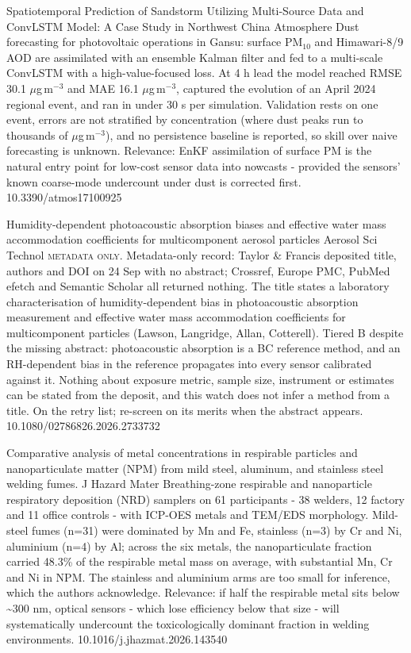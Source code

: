 \documentclass[10pt]{article}
\begin{document}
{Spatiotemporal Prediction of Sandstorm Utilizing Multi-Source Data and ConvLSTM Model: A Case Study in Northwest China}
{Atmosphere}
{Dust forecasting for photovoltaic operations in Gansu: surface PM$_{10}$ and Himawari-8/9 AOD are assimilated with an ensemble Kalman filter and fed to a multi-scale ConvLSTM with a high-value-focused loss. At 4 h lead the model reached RMSE 30.1 $\mu$g\,m$^{-3}$ and MAE 16.1 $\mu$g\,m$^{-3}$, captured the evolution of an April 2024 regional event, and ran in under 30 s per simulation. Validation rests on one event, errors are not stratified by concentration (where dust peaks run to thousands of $\mu$g\,m$^{-3}$), and no persistence baseline is reported, so skill over naive forecasting is unknown. Relevance: EnKF assimilation of surface PM is the natural entry point for low-cost sensor data into nowcasts - provided the sensors' known coarse-mode undercount under dust is corrected first.}
{10.3390/atmos17100925}

{Humidity-dependent photoacoustic absorption biases and effective water mass accommodation coefficients for multicomponent aerosol particles}
{Aerosol Sci Technol}
{\textsc{metadata only.} Metadata-only record: Taylor \& Francis deposited title, authors and DOI on 24 Sep with no abstract; Crossref, Europe PMC, PubMed efetch and Semantic Scholar all returned nothing. The title states a laboratory characterisation of humidity-dependent bias in photoacoustic absorption measurement and effective water mass accommodation coefficients for multicomponent particles (Lawson, Langridge, Allan, Cotterell). Tiered B despite the missing abstract: photoacoustic absorption is a BC reference method, and an RH-dependent bias in the reference propagates into every sensor calibrated against it. Nothing about exposure metric, sample size, instrument or estimates can be stated from the deposit, and this watch does not infer a method from a title. On the retry list; re-screen on its merits when the abstract appears.}
{10.1080/02786826.2026.2733732}


{Comparative analysis of metal concentrations in respirable particles and nanoparticulate matter (NPM) from mild steel, aluminum, and stainless steel welding fumes.}
{J Hazard Mater}
{Breathing-zone respirable and nanoparticle respiratory deposition (NRD) samplers on 61 participants - 38 welders, 12 factory and 11 office controls - with ICP-OES metals and TEM/EDS morphology. Mild-steel fumes (n=31) were dominated by Mn and Fe, stainless (n=3) by Cr and Ni, aluminium (n=4) by Al; across the six metals, the nanoparticulate fraction carried 48.3\% of the respirable metal mass on average, with substantial Mn, Cr and Ni in NPM. The stainless and aluminium arms are too small for inference, which the authors acknowledge. Relevance: if half the respirable metal sits below \textasciitilde{}300 nm, optical sensors - which lose efficiency below that size - will systematically undercount the toxicologically dominant fraction in welding environments.}
{10.1016/j.jhazmat.2026.143540}
\end{document}
